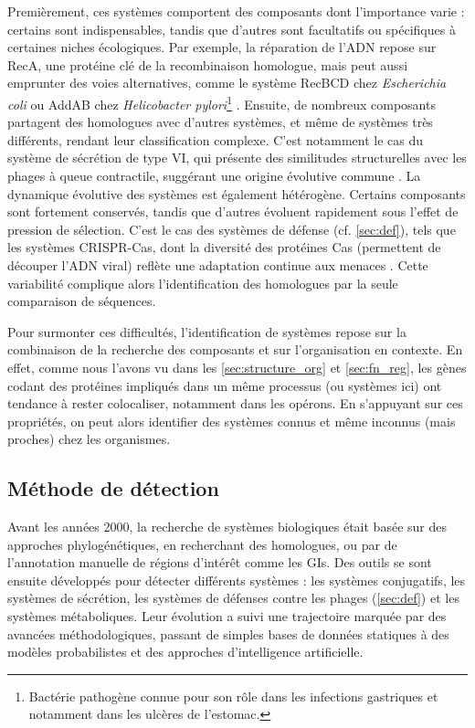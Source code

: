 Premièrement, ces systèmes comportent des composants dont l'importance varie : certains sont indispensables, tandis que d'autres sont facultatifs ou spécifiques à certaines niches écologiques. Par exemple, la réparation de l’ADN repose sur RecA, une protéine clé de la recombinaison homologue, mais peut aussi emprunter des voies alternatives, comme le système RecBCD chez \textit{Escherichia coli} ou AddAB chez \textit{Helicobacter pylori}\footnote{Bactérie pathogène connue pour son rôle dans les infections gastriques et notamment dans les ulcères de l'estomac.} \cite{dillingham_recbcd_2008}. Ensuite, de nombreux composants partagent des homologues avec d’autres systèmes, et même de systèmes très différents, rendant leur classification complexe. C’est notamment le cas du système de sécrétion de type VI, qui présente des similitudes structurelles avec les phages à queue contractile, suggérant une origine évolutive commune \cite{coulthurst_type_2013}. La dynamique évolutive des systèmes est également hétérogène. Certains composants sont fortement conservés, tandis que d'autres évoluent rapidement sous l'effet de pression de sélection. C'est le cas des systèmes de défense (cf. \autoref{sec:def}), tels que les systèmes CRISPR-Cas, dont la diversité des protéines Cas (permettent de découper l'ADN viral) reflète une adaptation continue aux menaces \cite{makarova_comparative_2013}. Cette variabilité complique alors l’identification des homologues par la seule comparaison de séquences.

Pour surmonter ces difficultés, l'identification de systèmes repose sur la combinaison de la recherche des composants et sur l'organisation en contexte. En effet, comme nous l'avons vu dans les \autoref{sec:structure_org} et \autoref{sec:fn_reg}, les gènes codant des protéines impliqués dans un même processus (ou systèmes ici) ont tendance à rester colocaliser, notamment dans les opérons. En s'appuyant sur ces propriétés, on peut alors identifier des systèmes connus et même inconnus (mais proches) chez les organismes.

\subsection{Méthode de détection}

Avant les années 2000, la recherche de systèmes biologiques était basée sur des approches phylogénétiques, en recherchant des homologues, ou par de l'annotation manuelle de régions d'intérêt comme les GIs. Des outils se sont ensuite développés pour détecter différents systèmes : les systèmes conjugatifs, les systèmes de sécrétion, les systèmes de défenses contre les phages (\autoref{sec:def}) et les systèmes métaboliques. Leur évolution a suivi une trajectoire marquée par des avancées méthodologiques, passant de simples bases de données statiques à des modèles probabilistes et des approches d’intelligence artificielle.

